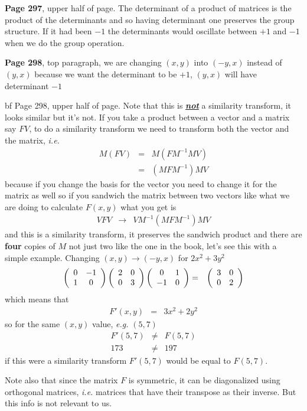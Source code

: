 \documentclass[aps,preprint,preprintnumbers,nofootinbib,showpacs,prd]{revtex4-1}
\newcommand{\ie}{{\it i.e.} }
\newcommand{\eg}{{\it e.g.} }
\newcommand{\nbea}{\begin{eqnarray*}}
\newcommand{\neea}{\end{eqnarray*}}
\begin{document}
{\bf Page 297}, upper half of page. The determinant of a product of matrices is the product of the determinants and so having determinant one preserves the group structure. If it had been $-1$ the determinants would oscillate between $+1$ and $-1$ when we do the group operation.

{\bf Page 298}, top paragraph, we are changing $(x,y)$ into $(-y,x)$ instead of $(y,x)$ because we want the determinant to be $+1$, $(y,x)$ will have determinant $-1$

{bf Page 298}, upper half of page. Note that this is \underline{\textbf{\textit{not}}} a similarity transform, it looks similar but it's not. If you take a product between a vector and a matrix say $FV$, to do a similarity transform we need to transform both the vector and the matrix, \ie
%
\nbea
M(FV) & = & M(FM^{-1}MV) \\
& = & (MFM^{-1})MV
\neea
%
because if you change the basis for the vector you need to change it for the matrix as well so if you sandwich the matrix between two vectors like what we are doing to calculate $F(x,y)$ what you get is
%
\nbea
VFV & \to & VM^{-1}(MFM^{-1})MV
\neea
%
and this is a similarity transform, it preserves the sandwich product and there are {\bf four} copies of $M$ not just two like the one in the book, let's see this with a simple example. Changing $(x,y) \to (-y,x)$ for $2x^2 + 3y^2$
%
\nbea
\left(
\begin{array}{c c}
0 & -1 \\
1 & 0
\end{array}
\right)
\left(
\begin{array}{c c}
2 & 0 \\
0 & 3
\end{array}
\right)
\left(
\begin{array}{c c}
0 & 1 \\
-1 & 0
\end{array}
\right) & = & 
\left(
\begin{array}{c c}
3 & 0 \\
0 & 2
\end{array}
\right)
\neea
%
which means that
%
\nbea
F'(x,y) & = & 3x^2 + 2y^2
\neea
%
so for the same $(x,y)$ value, \eg $(5,7)$
%
\nbea
F'(5,7) & \neq & F(5,7) \\
173 & \neq & 197
\neea
%
if this were a similarity transform $F'(5,7)$ would be equal to $F(5,7)$.

Note also that since the matrix $F$ is symmetric, it can be diagonalized using orthogonal matrices, \ie matrices that have their transpose as their inverse. But this info is not relevant to us.
\end{document}
